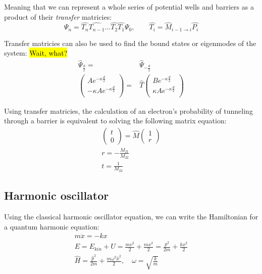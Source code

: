 			Meaning that we can represent a whole series of potential wells and barriers as a product of their \textit{transfer} matricies:
			\begin{equation}
				\Psi_n = \hat{T_n}\hat{T_{n-1}}...\hat{T_2}\hat{T_1}\Psi_0, \qquad \hat{T_i} = \hat{M}_{i-1\rightarrow i}\hat{P_i} 
			\end{equation}
			
			Transfer matricies can also be used to find the bound states or eigenmodes of the system:
			\hl{Wait, what?}
			\begin{align}
				\hat{\Psi}_{\frac{d}{2}} =& \hat{\Psi}_{-\frac{d}{2}} \\
				\begin{pmatrix}
					Ae^{-\kappa \frac{d}{2}} \\
					-\kappa Ae^{-\kappa \frac{d}{2}} \\
				\end{pmatrix} =& \hat{T} 
				\begin{pmatrix}
					Be^{-\kappa \frac{d}{2}} \\
					\kappa Ae^{-\kappa \frac{d}{2}} \\
				\end{pmatrix}
			\end{align}
			
			Using transfer matricies, the calculation of an electron's probability of tunneling through a barrier is equivalent to solving the following matrix equation:
			\begin{align}
				\begin{pmatrix}
					t \\
					0
				\end{pmatrix} = \hat{M}
				\begin{pmatrix}
					1 \\
					r
				\end{pmatrix} \\
				r  = -\frac{M_{21}}{M_{22}} \\
				t = \frac{1}{M_{22}}
			\end{align}
	\subsection{Harmonic oscillator}
	\label{sec:harmonic}

	Using the classical harmonic oscillator equation, we can write the Hamiltonian for a quantum harmonic equation:
	\begin{align}
		m\ddot{x} = -kx \\
		E = E_{kin} + U = \frac{mv^2}{2} + \frac{mx^2}{2} = \frac{p^2}{2m} + \frac{kx^2}{2} \\
		\hat{H} = \frac{\hat{p}^2}{2m} + \frac{m\omega^2\hat{x}^2}{2}, \quad \omega = \sqrt{\frac{k}{m}}
	\end{align}
	
